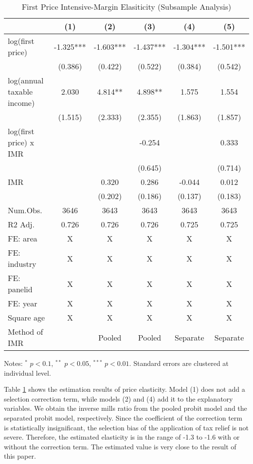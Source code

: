 \documentclass[
  11pt,
  a4paper,
]{article}
\begin{document}
\begin{table}

\caption{\label{tab:benchmark}First Price Intensive-Margin Elasiticity (Subsample Analysis)}
\centering
\fontsize{9}{11}\selectfont
\begin{threeparttable}
\begin{tabular}[t]{lccccc}
\toprule
  & (1) & (2) & (3) & (4) & (5)\\
\midrule
log(first price) & -1.325*** & -1.603*** & -1.437*** & -1.304*** & -1.501***\\
 & (0.386) & (0.422) & (0.522) & (0.384) & (0.542)\\
log(annual taxable income) & 2.030 & 4.814** & 4.898** & 1.575 & 1.554\\
 & (1.515) & (2.333) & (2.355) & (1.863) & (1.857)\\
log(first price) x IMR &  &  & -0.254 &  & 0.333\\
 &  &  & (0.645) &  & (0.714)\\
IMR &  & 0.320 & 0.286 & -0.044 & 0.012\\
 &  & (0.202) & (0.186) & (0.137) & (0.183)\\
\midrule
Num.Obs. & 3646 & 3643 & 3643 & 3643 & 3643\\
R2 Adj. & 0.726 & 0.726 & 0.726 & 0.725 & 0.725\\
FE: area & X & X & X & X & X\\
FE: industry & X & X & X & X & X\\
FE: panelid & X & X & X & X & X\\
FE: year & X & X & X & X & X\\
Square age & X & X & X & X & X\\
Method of IMR &  & Pooled & Pooled & Separate & Separate\\
\bottomrule
\end{tabular}
\begin{tablenotes}
\item Notes: $^{*}$ $p < 0.1$, $^{**}$ $p < 0.05$, $^{***}$ $p < 0.01$. Standard errors are clustered at individual level.
\end{tablenotes}
\end{threeparttable}
\end{table}

Table \ref{tab:benchmark} shows the estimation results of price elasticity.
Model (1) does not add a selection correction term,
while models (2) and (4) add it to the explanatory variables.
We obtain the inverse mills ratio from the pooled probit model
and the separated probit model, respectively.
Since the coefficient of the correction term is statistically insignificant,
the selection bias of the application of tax relief is not severe.
Therefore, the estimated elasticity is in the range of -1.3 to -1.6
with or without the correction term.
The estimated value is very close to the result of this paper.
\end{document}
